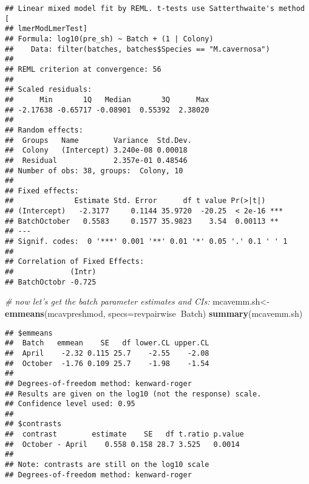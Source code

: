 \documentclass[]{article}
\newenvironment{Shaded}{\begin{snugshade}}{\end{snugshade}}
\newcommand{\CommentTok}[1]{\textcolor[rgb]{0.56,0.35,0.01}{\textit{#1}}}
\newcommand{\DataTypeTok}[1]{\textcolor[rgb]{0.13,0.29,0.53}{#1}}
\newcommand{\KeywordTok}[1]{\textcolor[rgb]{0.13,0.29,0.53}{\textbf{#1}}}
\newcommand{\NormalTok}[1]{#1}
\newcommand{\OperatorTok}[1]{\textcolor[rgb]{0.81,0.36,0.00}{\textbf{#1}}}
\newcommand{\StringTok}[1]{\textcolor[rgb]{0.31,0.60,0.02}{#1}}
\begin{document}
\begin{verbatim}
## Linear mixed model fit by REML. t-tests use Satterthwaite's method [
## lmerModLmerTest]
## Formula: log10(pre_sh) ~ Batch + (1 | Colony)
##    Data: filter(batches, batches$Species == "M.cavernosa")
## 
## REML criterion at convergence: 56
## 
## Scaled residuals: 
##      Min       1Q   Median       3Q      Max 
## -2.17638 -0.65717 -0.08901  0.55392  2.38020 
## 
## Random effects:
##  Groups   Name        Variance  Std.Dev.
##  Colony   (Intercept) 3.240e-08 0.00018 
##  Residual             2.357e-01 0.48546 
## Number of obs: 38, groups:  Colony, 10
## 
## Fixed effects:
##              Estimate Std. Error      df t value Pr(>|t|)    
## (Intercept)   -2.3177     0.1144 35.9720  -20.25  < 2e-16 ***
## BatchOctober   0.5583     0.1577 35.9823    3.54  0.00113 ** 
## ---
## Signif. codes:  0 '***' 0.001 '**' 0.01 '*' 0.05 '.' 0.1 ' ' 1
## 
## Correlation of Fixed Effects:
##             (Intr)
## BatchOctobr -0.725
\end{verbatim}

\begin{Shaded}
\begin{Highlighting}[]
\CommentTok{# now let's get the batch parameter estimates and CIs:}
\NormalTok{mcavemm.sh<-}\StringTok{ }\KeywordTok{emmeans}\NormalTok{(mcavpreshmod, }\DataTypeTok{specs=}\NormalTok{revpairwise}\OperatorTok{~}\NormalTok{Batch) }
\KeywordTok{summary}\NormalTok{(mcavemm.sh)}
\end{Highlighting}
\end{Shaded}

\begin{verbatim}
## $emmeans
##  Batch   emmean    SE   df lower.CL upper.CL
##  April    -2.32 0.115 25.7    -2.55    -2.08
##  October  -1.76 0.109 25.7    -1.98    -1.54
## 
## Degrees-of-freedom method: kenward-roger 
## Results are given on the log10 (not the response) scale. 
## Confidence level used: 0.95 
## 
## $contrasts
##  contrast        estimate    SE   df t.ratio p.value
##  October - April    0.558 0.158 28.7 3.525   0.0014 
## 
## Note: contrasts are still on the log10 scale 
## Degrees-of-freedom method: kenward-roger
\end{verbatim}
\end{document}

